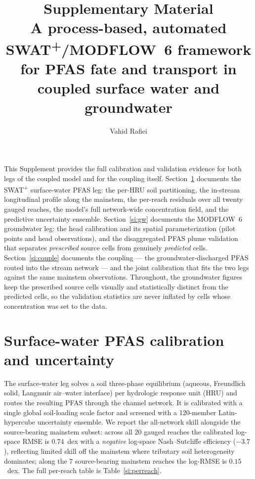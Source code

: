 \documentclass[12pt]{article}
\title{Supplementary Material\\
\large A process-based, automated SWAT\textsuperscript{+}/MODFLOW~6 framework for PFAS fate and
transport in coupled surface water and groundwater}
\author{Vahid Rafiei}
\date{}
\begin{document}
\maketitle

This Supplement provides the full calibration and validation evidence for both legs of the coupled
model and for the coupling itself. Section~\ref{si:sw} documents the SWAT\textsuperscript{+}
surface-water PFAS leg: the per-HRU soil partitioning, the in-stream longitudinal profile along the
mainstem, the per-reach residuals over all twenty gauged reaches, the model's full network-wide
concentration field, and the predictive uncertainty ensemble. Section~\ref{si:gw} documents the
MODFLOW~6 groundwater leg: the head calibration and its spatial parameterization (pilot points and
head observations), and the disaggregated PFAS plume validation that separates \emph{prescribed}
source cells from genuinely \emph{predicted} cells. Section~\ref{si:couple} documents the coupling ---
the groundwater-discharged PFAS routed into the stream network --- and the joint calibration that
fits the two legs against the same mainstem observations. Throughout, the groundwater figures keep
the prescribed source cells visually and statistically distinct from the predicted cells, so the
validation statistics are never inflated by cells whose concentration was set to the data.

\section{Surface-water PFAS calibration and uncertainty}\label{si:sw}

The surface-water leg solves a soil three-phase equilibrium (aqueous, Freundlich solid, Langmuir
air--water interface) per hydrologic response unit (HRU) and routes the resulting PFAS through the
channel network. It is calibrated with a single global soil-loading scale factor and screened with a
120-member Latin-hypercube uncertainty ensemble. We report the all-network skill alongside the
source-bearing mainstem subset: across all $20$ gauged reaches the calibrated log-space RMSE is
$0.74$~dex with a \emph{negative} log-space Nash--Sutcliffe efficiency ($-3.7$), reflecting limited
skill off the mainstem where tributary soil heterogeneity dominates; along the $7$ source-bearing
mainstem reaches the log-RMSE is $0.15$~dex. The full per-reach table is Table~\ref{si:perreach}.
\end{document}
